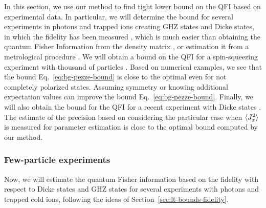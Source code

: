 In this section, we use our method to find tight lower bound on the QFI based on experimental data.
In particular, we will determine the bound for several experiments in photons and trapped ions creating GHZ states and Dicke states, in which the fidelity has been measured \cite{Krischek2011, Zhao2003, Gao2010, Leibfried2004, Sackett2000, Monz2011, Kiesel2007, Wieczorek2009, Prevedel2009, Chiuri2012}, which is much easier than obtaining the quantum Fisher Information from the density matrix \cite{Hyllus2012}, or estimation it from a metrological procedure \cite{Luecke2011}.
We will obtain a bound on the QFI for a spin-squeezing experiment with thousand of particles \cite{Gross2010}.
Based on numerical examples, we see that the bound Eq.~\eqref{eq:bg-pezze-bound} is close to the optimal even for not completely polarized states.
Assuming symmetry or knowing additional expectation values can improve the bound Eq.~\eqref{eq:bg-pezze-bound}.
Finally, we will also obtain the bound for the QFI for a recent experiment with Dicke states \cite{Luecke2014}.
The estimate of the precision based on considering the particular case when $\langle{J_x^2}\rangle$ is measured for parameter estimation \cite{Apellaniz2015} is close to the optimal bound computed by our method.

\subsubsection{Few-particle experiments}

Now, we will estimate the quantum Fisher information based on the fidelity with respect to Dicke states and GHZ states for several experiments with photons and trapped cold ions, following the ideas of Section~\ref{sec:lt-bounds-fidelity}.

